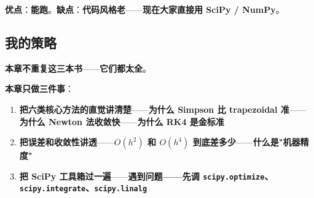 \textbf{优点}：\textbf{能跑}。\textbf{缺点}：\textbf{代码风格老}——\textbf{现在大家直接用 SciPy / NumPy}。

\subsection{我的策略}

\textbf{本章不重复这三本书}——\textbf{它们都太全}。

\textbf{本章只做三件事}：

\begin{enumerate}
\item \textbf{把六类核心方法的直觉讲清楚}——\textbf{为什么 Simpson 比 trapezoidal 准}——\textbf{为什么 Newton 法收敛快}——\textbf{为什么 RK4 是金标准}
\item \textbf{把误差和收敛性讲透}——\textbf{$O(h^2)$ 和 $O(h^4)$ 到底差多少}——\textbf{什么是"机器精度"}
\item \textbf{把 SciPy 工具箱过一遍}——\textbf{遇到问题——先调 \texttt{scipy.optimize}、\texttt{scipy.integrate}、\texttt{scipy.linalg}}
\end{enumerate}

